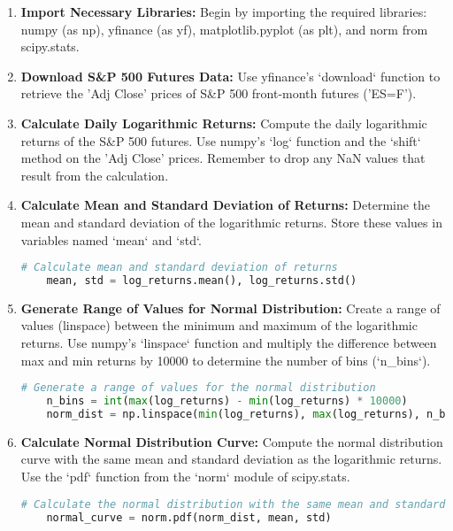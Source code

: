 \documentclass{article}
\begin{document}
\begin{enumerate}
    \item \textbf{Import Necessary Libraries:} 
    Begin by importing the required libraries: numpy (as np), yfinance (as yf), matplotlib.pyplot (as plt), and norm from scipy.stats.

    \item \textbf{Download S\&P 500 Futures Data:}
    Use yfinance's `download` function to retrieve the 'Adj Close' prices of S\&P 500 front-month futures ('ES=F'). 

    \item \textbf{Calculate Daily Logarithmic Returns:}
    Compute the daily logarithmic returns of the S\&P 500 futures. Use numpy's `log` function and the `shift` method on the 'Adj Close' prices. Remember to drop any NaN values that result from the calculation.

    \item \textbf{Calculate Mean and Standard Deviation of Returns:}
    Determine the mean and standard deviation of the logarithmic returns. Store these values in variables named `mean` and `std`.
    \begin{lstlisting}[language=Python]
    # Calculate mean and standard deviation of returns
    mean, std = log_returns.mean(), log_returns.std()
    \end{lstlisting}

    \item \textbf{Generate Range of Values for Normal Distribution:}
    Create a range of values (linspace) between the minimum and maximum of the logarithmic returns. Use numpy's `linspace` function and multiply the difference between max and min returns by 10000 to determine the number of bins (`n\_bins`).
    \begin{lstlisting}[language=Python]
    # Generate a range of values for the normal distribution
    n_bins = int(max(log_returns) - min(log_returns) * 10000)
    norm_dist = np.linspace(min(log_returns), max(log_returns), n_bins)
    \end{lstlisting}

    \item \textbf{Calculate Normal Distribution Curve:}
    Compute the normal distribution curve with the same mean and standard deviation as the logarithmic returns. Use the `pdf` function from the `norm` module of scipy.stats.
    \begin{lstlisting}[language=Python]
    # Calculate the normal distribution with the same mean and standard deviation
    normal_curve = norm.pdf(norm_dist, mean, std)
    \end{lstlisting}


\end{enumerate}
\end{document}
